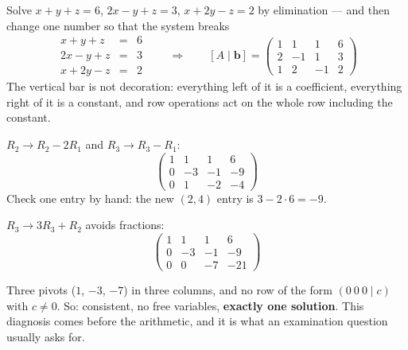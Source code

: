 \begin{worked}{Solve $x+y+z=6$, $2x-y+z=3$, $x+2y-z=2$ by elimination --- and then change one number so that the system breaks}
\[
  \begin{array}{rcl}
    x+y+z&=&6\\ 2x-y+z&=&3\\ x+2y-z&=&2
  \end{array}
  \qquad\Longrightarrow\qquad
  [A\mid\mathbf b]=
  \left(\begin{array}{ccc|c}
    1&1&1&6\\ 2&-1&1&3\\ 1&2&-1&2
  \end{array}\right)
\]
The vertical bar is not decoration: everything left of it is a coefficient,
everything right of it is a constant, and row operations act on the whole
row including the constant.

$R_{2}\to R_{2}-2R_{1}$ and $R_{3}\to R_{3}-R_{1}$:
\[
  \left(\begin{array}{ccc|c}
    1&1&1&6\\ 0&-3&-1&-9\\ 0&1&-2&-4
  \end{array}\right)
\]
Check one entry by hand: the new $(2,4)$ entry is $3-2\cdot6=-9$. \checkmark

$R_{3}\to 3R_{3}+R_{2}$ avoids fractions:
\[
  \left(\begin{array}{ccc|c}
    1&1&1&6\\ 0&-3&-1&-9\\ 0&0&-7&-21
  \end{array}\right)
\]

Three pivots ($1$, $-3$, $-7$) in three columns, and no row of the form
$(0\ 0\ 0\mid c)$ with $c\neq0$. So: consistent, no free variables,
\textbf{exactly one solution}. This diagnosis comes before the arithmetic,
and it is what an examination question usually asks for.


\end{worked}
